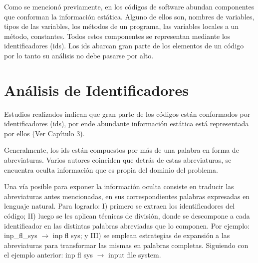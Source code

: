 Como se mencionó previamente, en los códigos de software abundan componentes que conforman la información estática. Alguno de ellos son, nombres de variables, tipos de las variables, los métodos de un programa, las variables locales a un método, constantes. Todos estos componentes se representan mediante los identificadores (ids). Los ids abarcan gran parte de los elementos de un código por lo tanto su análisis no debe pasarse por alto. 



\section{Análisis de Identificadores}

Estudios realizados \cite{DFPM05,DMDJ13,HDD06,FBL06} indican que gran parte de los códigos están conformados por identificadores (ids), por ende abundante información estática está representada por ellos (Ver Capítulo 3).

Generalmente, los ids están compuestos por más de una palabra en forma de abreviaturas. Varios autores coinciden \cite{BCPT99,LFBEX07,EZH08,EHPV09} que detrás de estas abreviaturas, se encuentra oculta información que es propia del dominio del problema.

Una vía posible para exponer la información oculta consiste en traducir las abreviaturas antes mencionadas, en sus correspondientes palabras expresadas en lenguaje natural.
Para lograrlo: I) primero se extraen los identificadores del código; II) luego se les aplican técnicas de división, donde se descompone a cada identificador en las distintas palabras abreviadas que lo componen. Por ejemplo: \textsf{inp\_fl\_sys} $\rightarrow$ \textsf{inp fl sys}; y III) se emplean estrategias de expansión a las abreviaturas para transformar las mismas en palabras completas. Siguiendo con el ejemplo anterior: \textsf{inp fl sys} $\rightarrow$ \textsf{input file system}.


